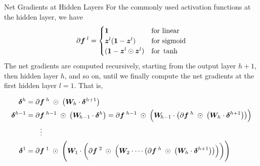 \begin{frame}{Net Gradients at Hidden Layers}
For the commonly used activation functions at the hidden layer, %
we have
\begin{align*}
    \partial {\boldsymbol f}^{\;l} = 
    \begin{cases}
        \mathbf{1} & \text{for linear}\\
        {\boldsymbol z}^l (\mathbf{1} - {\boldsymbol z}^l) & \text{for sigmoid}\\
        (\mathbf{1} - {\boldsymbol z}^l \odot {\boldsymbol z}^l) & \text{for }\tanh\\
    \end{cases}
\end{align*}
%
The net gradients are computed recursively, starting from the output
layer $h+1$, then hidden layer $h$, and so on, until we finally compute
the net gradients at the first hidden layer $l=1$. That is,
\begin{samepage}
\begin{align*}
{\bm \delta}^h & = \partial{\boldsymbol f}^{\;h} \;\odot\; \left({\boldsymbol W}_h \cdot
{\bm \delta}^{h+1}\right) \\
{\bm \delta}^{h-1} & = 
\partial{\boldsymbol f}^{\;h-1} \;\odot\; \left({\boldsymbol W}_{\!h-1} \cdot
{\bm \delta}^{h}\right) =    
\partial{\boldsymbol f}^{\;h-1} \;\odot\; 
    \Bigl({\boldsymbol W}_{\!h-1} \cdot 
    \bigl( \partial{\boldsymbol f}^{\;h} \;\odot\; \left({\boldsymbol W}_h \cdot {\bm \delta}^{h+1}\right) 
    \bigr) 
    \Bigr) \\
  & \qquad \vdots\\
   {\bm \delta}^1 
   & = \partial{\boldsymbol f}^{\;1} \;\odot\; 
   \Biggl({\boldsymbol W}_1 \cdot 
    \biggl( \partial{\boldsymbol f}^{\;2} \;\odot\; 
    \Bigl({\boldsymbol W}_2 \cdot 
    \cdots
    \bigl( \partial{\boldsymbol f}^{\;h} \;\odot\; \left({\boldsymbol W}_h \cdot {\bm \delta}^{h+1}\right) 
    \bigr) 
    \Bigr) 
    \biggr)
   \Biggr)
\end{align*}
\end{samepage}
\end{frame}
%
%
